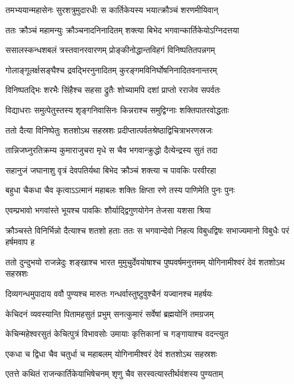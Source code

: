 \twolineshloka
{तमभ्ययान्महासेनः सुरशत्रुमुदारधीः}
{स कार्तिकेयस्य भयात्क्रौञ्चं शरणमीयिवान्}


\twolineshloka
{ततः क्रौञ्चं महामन्युः क्रौञ्चनादनिनादितम्}
{शक्त्या बिभेद भगवान्कार्तिकेयोऽग्निदत्तया}


\twolineshloka
{ससालस्कन्धशबलं त्रस्तवानरवारणम्}
{प्रोङ्कीनोद्धान्तविहगं विनिष्पतितपन्नगम्}


\twolineshloka
{गोलाङ्गूलर्क्षसङ्घैश्च द्रवद्भिरनुनादितम्}
{कुरङ्गमविनिर्घोषनिनादितवनान्तरम्}


\twolineshloka
{विनिष्पतद्भिः शरभैः सिंहैश्च सहसा द्रुतैः}
{शोच्यामपि दशां प्राप्तो रराजेव सपर्वतः}


\twolineshloka
{विद्याधराः समुत्पेतुस्तस्य शृङ्गनिवासिनः}
{किन्नराश्च समुद्विग्नाः शक्तिपातरवोद्धताः}


\twolineshloka
{ततो दैत्या विनिष्पेतुः शतशोऽथ सहस्रशः}
{प्रदीप्तात्पर्वतश्रेष्ठाद्विचित्राभरणस्रजः}


\twolineshloka
{तान्निजघ्नुरतिक्रम्य कुमाराजुचरा मृधे}
{स चैव भगवान्क्रुद्धो दैत्येन्द्रस्य सुतं तदा}


\twolineshloka
{सहानुजं जघानाशु वृत्रं देवपतिर्यथा}
{बिभेद क्रौञ्चं शक्त्या च पावकिः परवीरहा}


\twolineshloka
{बहुधा चैकधा चैव कृत्वाऽऽत्मानं महाबलः}
{शक्तिः क्षिप्ता रणे तस्य पाणिमेति पुनः पुनः}


\twolineshloka
{एवम्प्रभावो भगवांस्ते भूयश्च पावकिः}
{शौर्याद्द्विगुणयोगेन तेजसा यशसा श्रिया}


क्रौञ्चस्ते विनिर्भिन्नो दैत्याश्च शतशो हताः
\twolineshloka
{ततः स भगवान्देवो निहत्य विबुधद्विषः}
{सभाज्यमानो विबुधैः परं हर्षमवाप ह}


\threelineshloka
{ततो दुन्दुभयो राजन्नेदुः शङ्खाश्च भारत}
{मुमुचुर्देवयोषाश्च पुष्पवर्षमनुत्तमम्}
{योगिनामीश्वरं देवं शतशोऽथ सहस्रशः}


\twolineshloka
{दिव्यगन्धमुपादाय ववौ पुण्यश्च मारुतः}
{गन्धर्वास्तुष्टुवुश्चैनं यज्वानश्च महर्षयः}


\twolineshloka
{केचिदनं व्यवस्यान्ति पितामहसुतं प्रभुम्}
{सनत्कुमारं सर्वेषां ब्रह्मयोनिं तमग्रजम्}


\twolineshloka
{केचिन्महेश्वरसुतं केचित्पुत्रं विभावसोः}
{उमायाः कृत्तिकानां च गङ्गायाश्च वदन्त्युत}


\twolineshloka
{एकधा च द्विधा चैव चतुर्धा च महाबलम्}
{योगिनामीश्वरं देवं शतशोऽथ सहस्रशः}


\twolineshloka
{एतत्ते कथितं राजन्कार्तिकेयाभिषेचनम्}
{शृणु चैव सरस्वत्यास्तीर्थवंशस्य पुण्यताम्}


